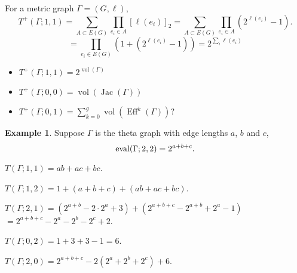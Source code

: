 \documentclass{amsart}
\theoremstyle{definition}
\newtheorem{eg}[thm]{Example}
\DeclareMathOperator{\Eff}{Eff}
\DeclareMathOperator{\Jac}{Jac}
\DeclareMathOperator{\vol}{vol}
\begin{document}
For a metric graph $\Gamma = (G,\ell)$,
\[ T^+(\Gamma;1,1) = \sum_{A \subset E(G)} \prod_{e_i \in A} [\ell(e_i)]_{2}
= \sum_{A \subset E(G)} \prod_{e_i \in A} (2^{\ell(e_i)} - 1) .\]
\[ = \prod_{e_i \in E(G)} (1 + (2^{\ell(e_i)} - 1))
 = 2^{\sum_i \ell(e_i)}\]
\begin{itemize}
\item 
$T^+(\Gamma;1,1) = 2^{\vol(\Gamma)}$

\item 
$T^+(\Gamma;0,0) = \vol(\Jac(\Gamma))$

\item 
$T^+(\Gamma;0,1) = \sum_{k=0}^g \vol(\Eff^k(\Gamma))$?

\end{itemize}

\begin{eg}
Suppose $\Gamma$ is the theta graph with edge lengths $a$, $b$ and $c$,
\[ {\rm eval}(\Gamma; 2,2) = 2^{a+b+c} .\]

$T(\Gamma; 1,1) = ab + ac + bc$.

$T(\Gamma; 1,2) = 1 + (a + b + c) + (ab + ac + bc)$.

$T(\Gamma; 2,1) = (2^{a+b}  -2\cdot 2^a + 3) + (2^{a+b+c}-2^{a+b} + 2^a - 1)$
$= 2^{a+b+c} - 2^a - 2^b - 2^c + 2$.

$T(\Gamma; 0,2) = 1 + 3 + 3 - 1 = 6$.

$T(\Gamma; 2,0) = 2^{a+b+c} - 2(2^a + 2^b + 2^c) + 6$.
\end{eg}
\end{document}
